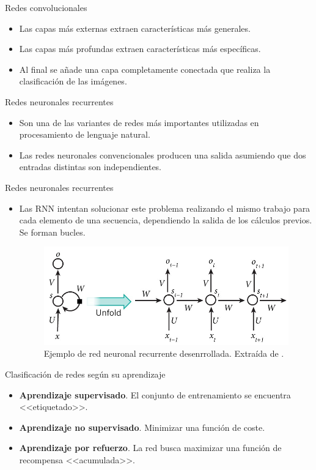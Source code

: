 \documentclass[spanish]{beamer}
\begin{document}
\begin{frame}{Redes convolucionales}
    \begin{itemize}
        \item Las capas más externas extraen características más generales.
        \item Las capas más profundas extraen características más específicas.
        \item Al final se añade una capa completamente conectada que realiza la clasificación de las imágenes.
    \end{itemize}
\end{frame}

\begin{frame}{Redes neuronales recurrentes}
\begin{itemize}
\item Son una de las variantes de redes más importantes utilizadas en procesamiento
de lenguaje natural.
\item Las redes neuronales convencionales producen una salida asumiendo que dos entradas distintas son independientes.
\end{itemize}
\end{frame}

\begin{frame}{Redes neuronales recurrentes}
\begin{itemize}
\item Las RNN intentan solucionar este problema realizando el mismo
trabajo para cada elemento de una secuencia, dependiendo la salida
de los cálculos previos. Se forman bucles.
\vspace{1em}
\begin{figure}[h]
    \centering
    \includegraphics[width=0.6\linewidth]{img/rnn}
    \caption{Ejemplo de red neuronal recurrente desenrrollada. Extraída de \parencite{nigam_understanding_2018}.}%
    \label{fig:rnn}
\end{figure}
\end{itemize}
\end{frame}

\begin{frame}{Clasificación de redes según su aprendizaje}
      \begin{itemize}
      \item \textbf{Aprendizaje supervisado}. El conjunto de entrenamiento se
        encuentra <<etiquetado>>.
      \item \textbf{Aprendizaje no supervisado}. Minimizar una función de coste.
      \item \textbf{Aprendizaje por refuerzo}. La red busca maximizar una función de
        recompensa <<acumulada>>.
      \end{itemize}
\end{frame}
\end{document}

